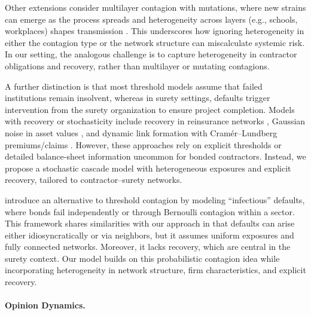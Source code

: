 \documentclass[mnsc,nonblindrev]{informs3}
\begin{document}
Other extensions consider multilayer contagion with mutations, where new strains can emerge as the process spreads and heterogeneity across layers (e.g., schools, workplaces) shapes transmission \citep{SoodSridhar2023}. This underscores how ignoring heterogeneity in either the contagion type or the network structure can miscalculate systemic risk. In our setting, the analogous challenge is to capture heterogeneity in contractor obligations  and recovery, rather than multilayer or mutating contagions.

A further distinction is that most threshold models assume that failed institutions remain insolvent, whereas in surety settings, defaults trigger intervention from the surety organization to ensure project completion. Models with recovery or stochasticity include recovery in reinsurance networks \citep{klages2020cascading}, Gaussian noise in asset values \citep{ramirez2023stochastic}, and dynamic link formation with Cramér–Lundberg premiums/claims \citep{amini2022dynamic}.  However, these approaches rely on explicit thresholds or detailed balance-sheet information uncommon for bonded contractors. Instead, we propose a stochastic cascade model with heterogeneous exposures and explicit recovery, tailored to contractor–surety networks.

\citet{davis2001infectious} introduce an alternative to threshold contagion by modeling ``infectious'' defaults, where bonds fail independently or through Bernoulli contagion within a sector. This framework shares similarities with our approach in that defaults can arise either idiosyncratically or via neighbors, but it assumes uniform exposures and fully connected networks. Moreover, it lacks recovery, which are central in the surety context. Our model builds on this probabilistic contagion idea while incorporating heterogeneity in network structure, firm characteristics, and explicit recovery.



\paragraph{Opinion Dynamics.}
\end{document}
